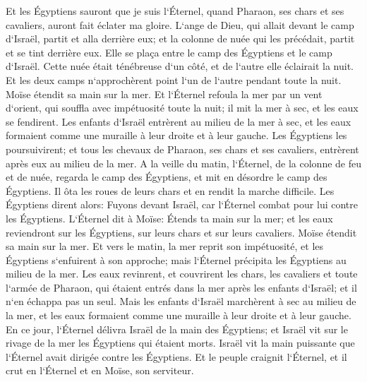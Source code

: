 \verse Et les Égyptiens sauront que je suis l`Éternel, quand Pharaon, ses chars et ses cavaliers, auront fait éclater ma gloire. 
\verse L`ange de Dieu, qui allait devant le camp d`Israël, partit et alla derrière eux; et la colonne de nuée qui les précédait, partit et se tint derrière eux. 
\verse Elle se plaça entre le camp des Égyptiens et le camp d`Israël. Cette nuée était ténébreuse d`un côté, et de l`autre elle éclairait la nuit. Et les deux camps n`approchèrent point l`un de l`autre pendant toute la nuit. 
\verse Moïse étendit sa main sur la mer. Et l`Éternel refoula la mer par un vent d`orient, qui souffla avec impétuosité toute la nuit; il mit la mer à sec, et les eaux se fendirent. 
\verse Les enfants d`Israël entrèrent au milieu de la mer à sec, et les eaux formaient comme une muraille à leur droite et à leur gauche. 
\verse Les Égyptiens les poursuivirent; et tous les chevaux de Pharaon, ses chars et ses cavaliers, entrèrent après eux au milieu de la mer. 
\verse A la veille du matin, l`Éternel, de la colonne de feu et de nuée, regarda le camp des Égyptiens, et mit en désordre le camp des Égyptiens. 
\verse Il ôta les roues de leurs chars et en rendit la marche difficile. Les Égyptiens dirent alors: Fuyons devant Israël, car l`Éternel combat pour lui contre les Égyptiens. 
\verse L`Éternel dit à Moïse: Étends ta main sur la mer; et les eaux reviendront sur les Égyptiens, sur leurs chars et sur leurs cavaliers. 
\verse Moïse étendit sa main sur la mer. Et vers le matin, la mer reprit son impétuosité, et les Égyptiens s`enfuirent à son approche; mais l`Éternel précipita les Égyptiens au milieu de la mer. 
\verse Les eaux revinrent, et couvrirent les chars, les cavaliers et toute l`armée de Pharaon, qui étaient entrés dans la mer après les enfants d`Israël; et il n`en échappa pas un seul. 
\verse Mais les enfants d`Israël marchèrent à sec au milieu de la mer, et les eaux formaient comme une muraille à leur droite et à leur gauche. 
\verse En ce jour, l`Éternel délivra Israël de la main des Égyptiens; et Israël vit sur le rivage de la mer les Égyptiens qui étaient morts. 
\verse Israël vit la main puissante que l`Éternel avait dirigée contre les Égyptiens. Et le peuple craignit l`Éternel, et il crut en l`Éternel et en Moïse, son serviteur. 

\chapter{}

